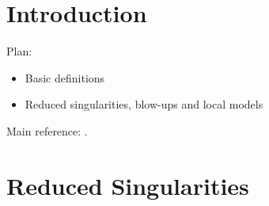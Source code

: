 
\section{Introduction}

Plan:
\begin{itemize}
    \item Basic definitions
    \item Reduced singularities, blow-ups and local models
\end{itemize}
Main reference: \cite{brunella_book}.

\section{Reduced Singularities}

